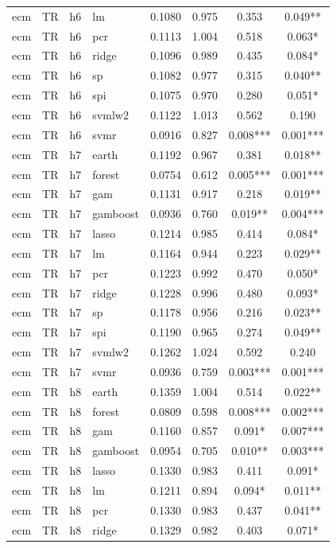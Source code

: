 \begin{ThreePartTable}
\begin{longtable}[t]{llclcccc}
ecm & TR & h6 & lm & 0.1080 & 0.975 & 0.353 & 0.049**\\
ecm & TR & h6 & pcr & 0.1113 & 1.004 & 0.518 & 0.063*\\
ecm & TR & h6 & ridge & 0.1096 & 0.989 & 0.435 & 0.084*\\
ecm & TR & h6 & sp & 0.1082 & 0.977 & 0.315 & 0.040**\\
ecm & TR & h6 & spi & 0.1075 & 0.970 & 0.280 & 0.051*\\
ecm & TR & h6 & svmlw2 & 0.1122 & 1.013 & 0.562 & 0.190\\
ecm & TR & h6 & svmr & 0.0916 & 0.827 & 0.008*** & 0.001***\\
\addlinespace
ecm & TR & h7 & earth & 0.1192 & 0.967 & 0.381 & 0.018**\\
ecm & TR & h7 & forest & 0.0754 & 0.612 & 0.005*** & 0.001***\\
ecm & TR & h7 & gam & 0.1131 & 0.917 & 0.218 & 0.019**\\
ecm & TR & h7 & gamboost & 0.0936 & 0.760 & 0.019** & 0.004***\\
ecm & TR & h7 & lasso & 0.1214 & 0.985 & 0.414 & 0.084*\\
ecm & TR & h7 & lm & 0.1164 & 0.944 & 0.223 & 0.029**\\
ecm & TR & h7 & pcr & 0.1223 & 0.992 & 0.470 & 0.050*\\
ecm & TR & h7 & ridge & 0.1228 & 0.996 & 0.480 & 0.093*\\
ecm & TR & h7 & sp & 0.1178 & 0.956 & 0.216 & 0.023**\\
ecm & TR & h7 & spi & 0.1190 & 0.965 & 0.274 & 0.049**\\
ecm & TR & h7 & svmlw2 & 0.1262 & 1.024 & 0.592 & 0.240\\
ecm & TR & h7 & svmr & 0.0936 & 0.759 & 0.003*** & 0.001***\\
\addlinespace
ecm & TR & h8 & earth & 0.1359 & 1.004 & 0.514 & 0.022**\\
ecm & TR & h8 & forest & 0.0809 & 0.598 & 0.008*** & 0.002***\\
ecm & TR & h8 & gam & 0.1160 & 0.857 & 0.091* & 0.007***\\
ecm & TR & h8 & gamboost & 0.0954 & 0.705 & 0.010** & 0.003***\\
ecm & TR & h8 & lasso & 0.1330 & 0.983 & 0.411 & 0.091*\\
ecm & TR & h8 & lm & 0.1211 & 0.894 & 0.094* & 0.011**\\
ecm & TR & h8 & pcr & 0.1330 & 0.983 & 0.437 & 0.041**\\
ecm & TR & h8 & ridge & 0.1329 & 0.982 & 0.403 & 0.071*\\

\end{longtable}
\end{ThreePartTable}
